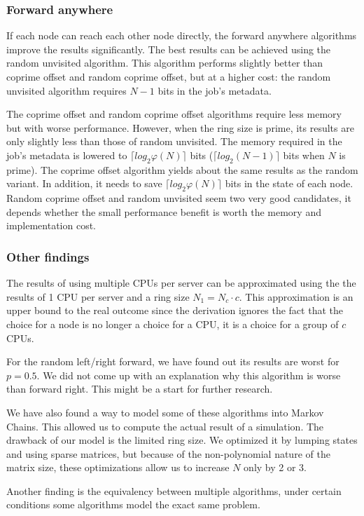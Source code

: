 \documentclass[10pt,a4paper]{article}
\begin{document}
\subsubsection*{Forward anywhere}
If each node can reach each other node directly, the forward anywhere algorithms improve the results significantly. The best results can be achieved using the random unvisited algorithm. This algorithm performs slightly better than coprime offset and random coprime offset, but at a higher cost: the random unvisited algorithm requires $N-1$ bits in the job's metadata.

The coprime offset and random coprime offset algorithms require less memory but with worse performance. However, when the ring size is prime, its results are only slightly less than those of random unvisited. The memory required in the job's metadata is lowered to $\lceil log_2 \varphi(N) \rceil$ bits ($\lceil log_2 (N-1) \rceil$ bits when $N$ is prime). The coprime offset algorithm yields about the same results as the random variant. In addition, it needs to save $\lceil log_2 \varphi(N) \rceil$ bits in the state of each node. Random coprime offset and random unvisited seem two very good candidates, it depends whether the small performance benefit is worth the memory and implementation cost.

\subsubsection*{Other findings}
The results of using multiple CPUs per server can be approximated using the the results of 1 CPU per server and a ring size $N_1 = N_c \cdot c$. This approximation is an upper bound to the real outcome since the derivation ignores the fact that the choice for a node is no longer a choice for a CPU, it is a choice for a group of $c$ CPUs. 

For the random left/right forward, we have found out its results are worst for $p=0.5$. We did not come up with an explanation why this algorithm is worse than forward right. This might be a start for further research.

We have also found a way to model some of these algorithms into Markov Chains. This allowed us to compute the actual result of a simulation. The drawback of our model is the limited ring size. We optimized it by lumping states and using sparse matrices, but because of the non-polynomial nature of the matrix size, these optimizations allow us to increase $N$ only by 2 or 3.

Another finding is the equivalency between multiple algorithms, under certain conditions some algorithms model the exact same problem.
\end{document}
